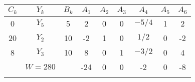     \begin{tabular}{ccccccccc}
    \hline
    \hline
    $C_k$   & $Y_k$   & $B_k$   & $A_1$   & $A_2$   & $A_3$   & $A_4$   & $A_5$   & $A_6$ \bigstrut\\
    \hline
    0       & $Y_5$   & 5       & 2       & 0       & 0       & $-5/4$  & 1       & 2 \bigstrut[t]\\
    20      & $Y_2$   & 10      & -2      & 1       & 0       & $1/2$   & 0       & -2 \\
    8       & $Y_3$   & 10      & 8       & 0       & 1       & $-3/2$  & 0       & 4 \bigstrut[b]\\
    \hline
            & $W=280$ &         & -24     & 0       & 0       & -2      & 0       & -8 \bigstrut\\
    \hline
    \hline
            &         &         &         &         &         &         &         &  \bigstrut[t]\\
    \end{tabular}%

